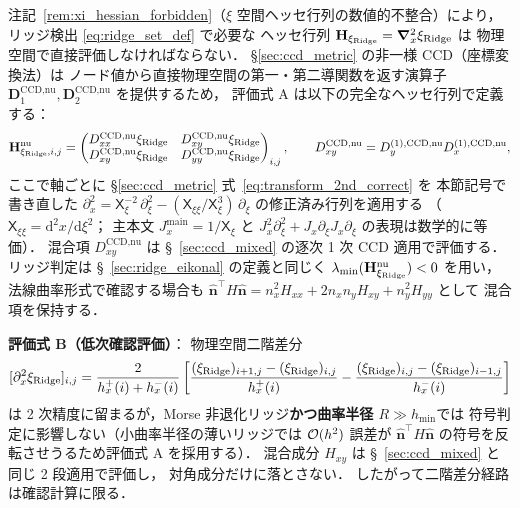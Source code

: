 注記~\ref{rem:xi_hessian_forbidden}（$\xi$ 空間ヘッセ行列の数値的不整合）により，
リッジ検出 \eqref{eq:ridge_set_def} で必要な
ヘッセ行列 $\mathbf{H}_{\xi_{\text{Ridge}}}=\bm{\nabla}_x^2 \xi_{\text{Ridge}}$ は
物理空間で直接評価しなければならない．
\S\ref{sec:ccd_metric} の非一様 CCD（座標変換法）は
ノード値から直接物理空間の第一・第二導関数を返す演算子
$\mathbf{D}_1^\text{CCD,nu}, \mathbf{D}_2^\text{CCD,nu}$ を提供するため，
評価式 A は以下の完全なヘッセ行列で定義する：
\begin{equation}
  \mathbf{H}_{\xi_{\text{Ridge}},i,j}^{\text{nu}}
  =
  \begin{pmatrix}
    D_{xx}^{\text{CCD,nu}}\xi_{\text{Ridge}} &
    D_{xy}^{\text{CCD,nu}}\xi_{\text{Ridge}} \\
    D_{xy}^{\text{CCD,nu}}\xi_{\text{Ridge}} &
    D_{yy}^{\text{CCD,nu}}\xi_{\text{Ridge}}
  \end{pmatrix}_{i,j},
  \qquad
  D_{xy}^{\text{CCD,nu}}
  = D_y^{(1),\text{CCD,nu}}D_x^{(1),\text{CCD,nu}},
  \label{eq:ridge_nu_hessian}
\end{equation}
ここで軸ごとに \S\ref{sec:ccd_metric} 式~\eqref{eq:transform_2nd_correct} を
本節記号で書き直した
$\partial_x^2 = \mathsf{X}_\xi^{-2}\,\partial_\xi^2
  - (\mathsf{X}_{\xi\xi}/\mathsf{X}_\xi^3)\,\partial_\xi$
の修正済み行列を適用する
（$\mathsf{X}_{\xi\xi} = \mathrm{d}^2 x/\mathrm{d}\xi^2$；
主本文 $J_x^{\mathrm{main}} = 1/\mathsf{X}_\xi$ と $J_x^2 \partial_\xi^2 + J_x\partial_\xi J_x \partial_\xi$
の表現は数学的に等価）．
混合項 $D_{xy}^{\text{CCD,nu}}$ は §~\ref{sec:ccd_mixed} の逐次 1 次 CCD 適用で評価する．
リッジ判定は §~\ref{sec:ridge_eikonal} の定義と同じく
$\lambda_{\min}(\mathbf{H}_{\xi_{\text{Ridge}}}^{\text{nu}})<0$ を用い，
法線曲率形式で確認する場合も
$\hat{\bm n}^{\!\top}H\hat{\bm n}
= n_x^2H_{xx}+2n_xn_yH_{xy}+n_y^2H_{yy}$ として
混合項を保持する．

\noindent\textbf{評価式 B（低次確認評価）}：
物理空間二階差分
\[
  [\partial_x^2\xi_{\text{Ridge}}]_{i,j}
  = \frac{2}{h_x^+(i)+h_x^-(i)}
    \left[\frac{(\xi_{\text{Ridge}})_{i+1,j}-(\xi_{\text{Ridge}})_{i,j}}{h_x^+(i)}
          - \frac{(\xi_{\text{Ridge}})_{i,j}-(\xi_{\text{Ridge}})_{i-1,j}}{h_x^-(i)}\right]
\]
は 2 次精度に留まるが，Morse 非退化リッジ\textbf{かつ曲率半径 $R \gg h_\text{min}$}では
符号判定に影響しない（小曲率半径の薄いリッジでは $\mathcal{O}(h^2)$ 誤差が
$\hat{\bm n}^{\!\top}H\hat{\bm n}$ の符号を反転させうるため評価式 A を採用する）．
混合成分 $H_{xy}$ は §~\ref{sec:ccd_mixed} と同じ 2 段適用で評価し，
対角成分だけに落とさない．
したがって二階差分経路は確認計算に限る．

